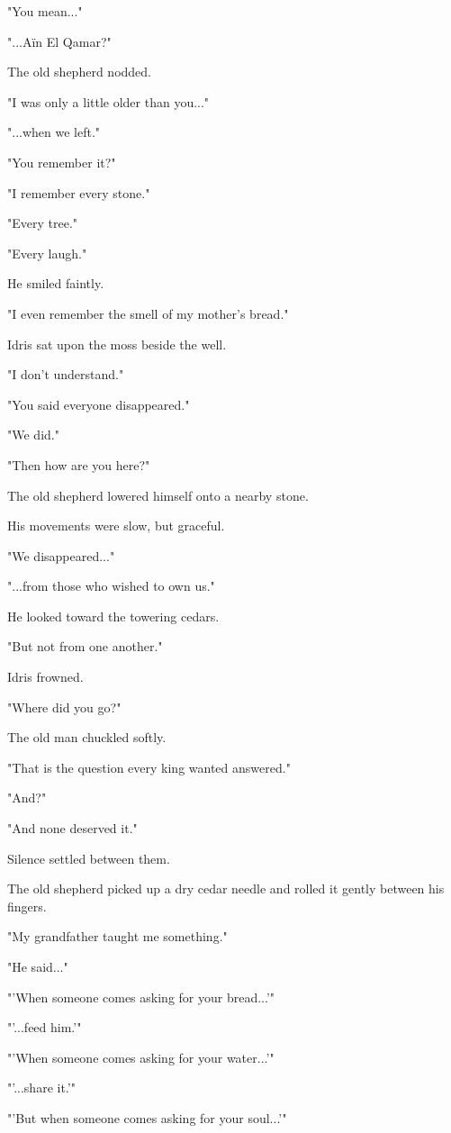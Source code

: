 \documentclass[12pt,openany]{book}
\begin{document}
"You mean..."

"...Aïn El Qamar?"

The old shepherd nodded.

"I was only a little older than you..."

"...when we left."

"You remember it?"

"I remember every stone."

"Every tree."

"Every laugh."

He smiled faintly.

"I even remember the smell of my mother's bread."

Idris sat upon the moss beside the well.

"I don't understand."

"You said everyone disappeared."

"We did."

"Then how are you here?"

The old shepherd lowered himself onto a nearby stone.

His movements were slow, but graceful.

"We disappeared..."

"...from those who wished to own us."

He looked toward the towering cedars.

"But not from one another."

Idris frowned.

"Where did you go?"

The old man chuckled softly.

"That is the question every king wanted answered."

"And?"

"And none deserved it."

Silence settled between them.

The old shepherd picked up a dry cedar needle and rolled it gently between his fingers.

"My grandfather taught me something."

"He said..."

"'When someone comes asking for your bread...'"

"'...feed him.'"

"'When someone comes asking for your water...'"

"'...share it.'"

"'But when someone comes asking for your soul...'"
\end{document}

